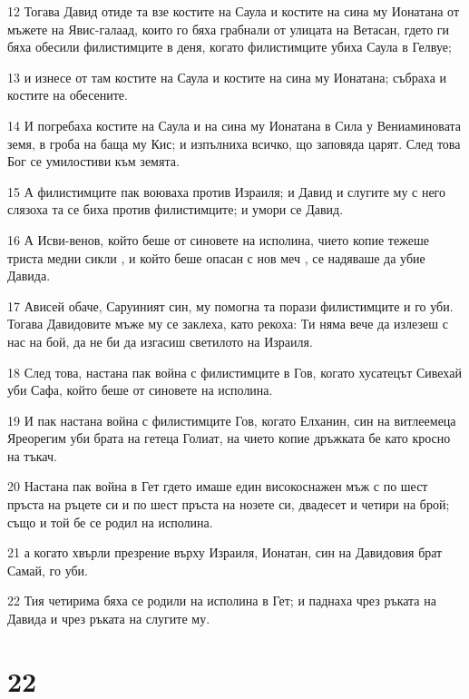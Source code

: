 \par 12 Тогава Давид отиде та взе костите на Саула и костите на сина му Ионатана от мъжете на Явис-галаад, които го бяха грабнали от улицата на Ветасан, гдето ги бяха обесили филистимците в деня, когато филистимците убиха Саула в Гелвуе;
\par 13 и изнесе от там костите на Саула и костите на сина му Ионатана; събраха и костите на обесените.
\par 14 И погребаха костите на Саула и на сина му Ионатана в Сила у Вениаминовата земя, в гроба на баща му Кис; и изпълниха всичко, що заповяда царят. След това Бог се умилостиви към земята.
\par 15 А филистимците пак воюваха против Израиля; и Давид и слугите му с него слязоха та се биха против филистимците; и умори се Давид.
\par 16 А Исви-венов, който беше от синовете на исполина, чието копие тежеше триста медни сикли , и който беше опасан с нов меч , се надяваше да убие Давида.
\par 17 Ависей обаче, Саруиният син, му помогна та порази филистимците и го уби. Тогава Давидовите мъже му се заклеха, като рекоха: Ти няма вече да излезеш с нас на бой, да не би да изгасиш светилото на Израиля.
\par 18 След това, настана пак война с филистимците в Гов, когато хусатецът Сивехай уби Сафа, който беше от синовете на исполина.
\par 19 И пак настана война с филистимците Гов, когато Елханин, син на витлеемеца Яреорегим уби брата на гетеца Голиат, на чието копие дръжката бе като кросно на тъкач.
\par 20 Настана пак война в Гет гдето имаше един високоснажен мъж с по шест пръста на ръцете си и по шест пръста на нозете си, двадесет и четири на брой; също и той бе се родил на исполина.
\par 21 а когато хвърли презрение върху Израиля, Ионатан, син на Давидовия брат Самай, го уби.
\par 22 Тия четирима бяха се родили на исполина в Гет; и паднаха чрез ръката на Давида и чрез ръката на слугите му.

\chapter{22}

